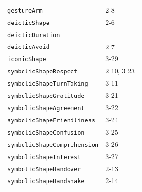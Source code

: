 \documentclass{CSSRforAfrica}
\begin{document}
\begin{table}[H]
\begin{center}
\begin{tabular}{|l l|}
{\footnotesize \verb+gestureArm+} 	                 & {\footnotesize 2-8} \vspace{-1.01mm}\\
{\footnotesize \verb+deicticShape+} 	                 & {\footnotesize 2-6} \vspace{-1.01mm}\\
{\footnotesize \verb+deicticDuration+} 	                 & {\footnotesize \verb++} \vspace{-1.01mm}\\
{\footnotesize \verb+deicticAvoid+} 	          & {\footnotesize 2-7} \vspace{-1.01mm}\\
{\footnotesize \verb+iconicShape+} 	                 & {\footnotesize 3-29} \vspace{-1.01mm}\\
{\footnotesize \verb+symbolicShapeRespect+} 	                 & {\footnotesize 2-10, 3-23 }\vspace{-1.01mm} \\
{\footnotesize \verb+symbolicShapeTurnTaking+} 	                 & {\footnotesize 3-11  }\vspace{-1.01mm} \\
{\footnotesize \verb+symbolicShapeGratitude+} 	                 & {\footnotesize 3-21 }\vspace{-1.01mm} \\
{\footnotesize \verb+symbolicShapeAgreement+} 	                 & {\footnotesize 3-22 }\vspace{-1.01mm} \\
{\footnotesize \verb+symbolicShapeFriendliness+} 	                 & {\footnotesize 3-24 }\vspace{-1.01mm} \\
{\footnotesize \verb+symbolicShapeConfusion+} 	                 & {\footnotesize  3-25}\vspace{-1.01mm} \\
{\footnotesize \verb+symbolicShapeComprehension+} 	                 & {\footnotesize 3-26 }\vspace{-1.01mm} \\
{\footnotesize \verb+symbolicShapeInterest+} 	                 & {\footnotesize 3-27 }\vspace{-1.01mm} \\
{\footnotesize \verb+symbolicShapeHandover+} 	                 & {\footnotesize  2-13}\vspace{-1.01mm} \\
{\footnotesize \verb+symbolicShapeHandshake+} 	                 & {\footnotesize   2-14  }\vspace{-1.01mm} \\

\end{tabular}
\end{center}
\end{table}
\end{document}

